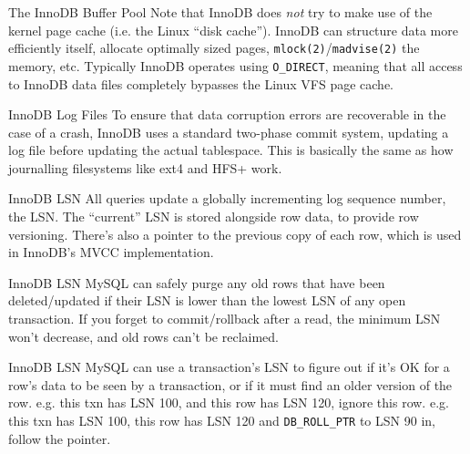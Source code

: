 \documentclass[14pt]{beamer}
\begin{document}
\begin{frame}{The InnoDB Buffer Pool}
  Note that InnoDB does \emph{not} try to make use of the kernel page cache
  (i.e. the Linux ``disk cache''). InnoDB can structure data more efficiently
  itself, allocate optimally sized pages, \texttt{mlock(2)}/\texttt{madvise(2)}
  the memory, etc.
  \newline
  \newline
  Typically InnoDB operates using \texttt{O\_DIRECT}, meaning that all access to
  InnoDB data files completely bypasses the Linux VFS page cache.
\end{frame}

\begin{frame}{InnoDB Log Files}
  To ensure that data corruption errors are recoverable in the case of a crash,
  InnoDB uses a standard two-phase commit system, updating a log file before
  updating the actual tablespace.
  \newline
  \newline
  This is basically the same as how journalling filesystems like ext4 and HFS+ work.
\end{frame}

\begin{frame}{InnoDB LSN}
  All queries update a globally incrementing log sequence number, the LSN. The
  ``current'' LSN is stored alongside row data, to provide row versioning.
  \newline
  \newline
  There's also a pointer to the previous copy of each row, which is used in
  InnoDB's MVCC implementation.
\end{frame}

\begin{frame}{InnoDB LSN}
  MySQL can safely purge any old rows that have been deleted/updated if their
  LSN is lower than the lowest LSN of any open transaction.
  \newline
  \newline
  If you forget to commit/rollback after a read, the minimum LSN won't decrease,
  and old rows can't be reclaimed.
\end{frame}

\begin{frame}{InnoDB LSN}
  MySQL can use a transaction's LSN to figure out if it's OK for a row's data to
  be seen by a transaction, or if it must find an older version of the
  row.
  \pause
  \newline
  \newline
  e.g. this txn has LSN 100, and this row has LSN 120, ignore this row.
  \pause
  \newline
  \newline
  e.g. this txn has LSN 100, this row has LSN 120 and \texttt{DB\_ROLL\_PTR} to
  LSN 90 in, follow the pointer.
\end{frame}
\end{document}
